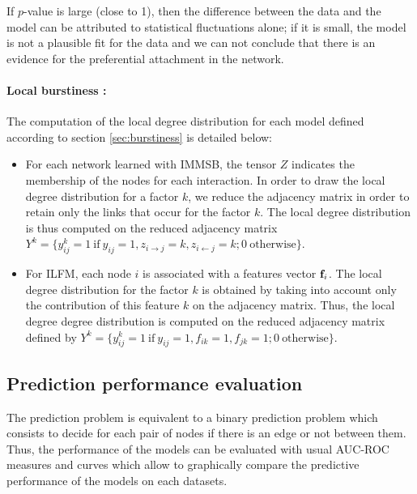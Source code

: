If  $p$-value is large (close to 1), then the difference between the data and the model can be attributed to statistical fluctuations alone; if it is small, the model is not a plausible fit for the data and we can not conclude that there is an evidence for the preferential attachment in the network. 


\paragraph{Local burstiness : }
The computation of the local degree distribution for each model defined according to section \ref{sec:burstiness} is detailed below: 
\begin{itemize}
    \item For each network learned with IMMSB, the tensor $Z$ indicates the membership of the nodes for each  interaction. In order to draw the local degree distribution for a factor $k$, we reduce the adjacency matrix in order to retain only the links that occur for the factor $k$. The local degree distribution is thus computed on the reduced adjacency matrix  $Y^k =\{ y_{ij}^k=1 \ \textrm{if}\ y_{ij}=1 , z_{i\rightarrow j}=k, z_{i\leftarrow j}=k; 0 \ \textrm{otherwise} \}$.
        \item For ILFM, each node $i$ is associated with a features vector $\mathbf{f}_{i}$. The local degree distribution for the factor $k$ is obtained by taking into account only the contribution of this feature $k$ on the adjacency matrix. Thus, the local degree degree distribution is computed on the reduced adjacency matrix defined by $Y^k =\{ y_{ij}^k=1 \ \textrm{if}\ y_{ij}=1 , f_{ik}=1, f_{jk}=1; 0 \ \textrm{otherwise}\}$.
\end{itemize}


\subsection{Prediction performance evaluation}
The prediction problem is equivalent to a binary prediction problem which consists to decide for each pair of nodes if there is an edge or not between them. 
Thus, the performance of the models can be evaluated with usual AUC-ROC measures and curves which allow to graphically compare the predictive performance of the models on each datasets.

